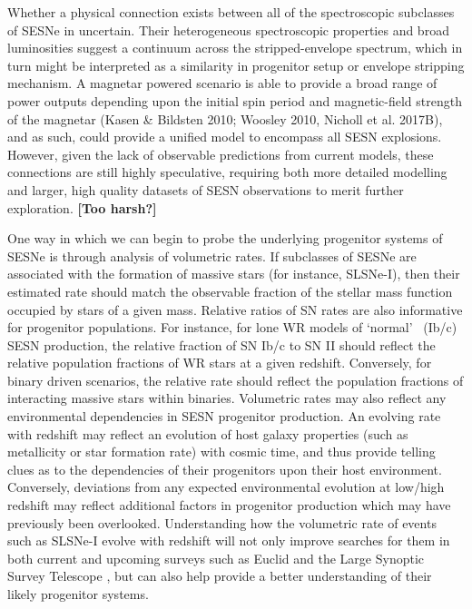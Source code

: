 \documentclass[a4paper,fleqn,usenatbib]{mnras}
\newcommand{\angus}[1]{\color{JungleGreen}#1\color{black}}
\newcommand{\comment}[1]{\textbf{[#1]}}
\begin{document}
Whether a physical connection exists between all of the spectroscopic subclasses of SESNe in uncertain. Their heterogeneous spectroscopic properties and broad luminosities suggest a continuum across the stripped-envelope spectrum, which in turn might be interpreted as a similarity in progenitor setup or envelope stripping mechanism. A magnetar powered scenario is able to provide a broad range of power outputs depending upon the initial spin period and magnetic-field strength of the magnetar \angus{(Kasen \& Bildsten 2010; Woosley 2010, Nicholl et al. 2017B)}, and as such, could provide a unified model to encompass all SESN explosions. However, given the lack of observable predictions from current models, these connections are still highly speculative, requiring both more detailed modelling and larger, high quality datasets of SESN observations to merit further exploration. \comment{\angus{Too harsh?}}  

One way in which we can begin to probe the underlying progenitor systems of SESNe is through analysis of volumetric rates. If subclasses of SESNe are associated with the formation of massive stars (for instance, SLSNe-I), then their estimated rate should match the observable fraction of the stellar mass function occupied by stars of a given mass. Relative ratios of SN rates are also informative for progenitor populations. For instance, for lone WR models of \lq normal\rq~ (Ib/c) SESN production, the relative fraction of SN Ib/c to SN II should reflect the relative population fractions of WR stars at a given redshift. Conversely, for binary driven scenarios, the relative rate should reflect the population fractions of interacting massive stars within binaries. Volumetric rates may also reflect any environmental dependencies in SESN progenitor production. An evolving rate with redshift may reflect an evolution of host galaxy properties (such as metallicity or star formation rate) with cosmic time, and thus provide telling clues as to the dependencies of their progenitors upon their host environment. Conversely, deviations from any expected environmental evolution at low/high redshift may reflect additional factors in progenitor production which may have previously been overlooked. Understanding how the volumetric rate of events such as SLSNe-I evolve with redshift will not only improve searches for them in both current and upcoming surveys such as Euclid and the Large Synoptic Survey Telescope \citep{Inserra2017Euclid,Villar2018}, but can also help provide a better understanding of their likely progenitor systems.
\end{document}

